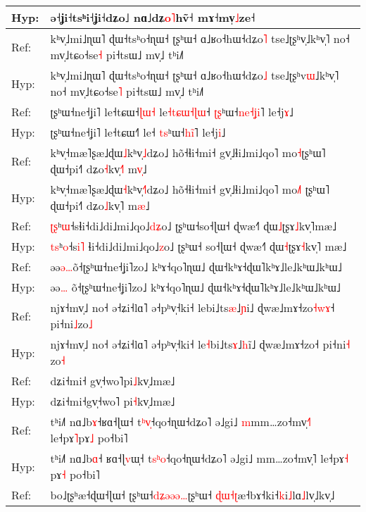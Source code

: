 \documentclass[10pt]{article}
\DeclareRobustCommand{\hl}[1]{{\textcolor{red}{#1}}}
\begin{document}
\begin{longtable}{ll}
Hyp: & ə˧ʝi˧tsʰi˧ʝi˧dʑo˩ nɑ˩dʑ\hl{o}\hl{˥}hṽ˧ mɤ˧mv̩\hl{˩}ze˧ \\ 
\midrule 
Ref: & kʰv̩˩mi˩ɳɯ˥ ɖɯ˧tsʰo˧ɳɯ˧ ʈʂʰɯ˧ ɑ˩ʁo˧hɯ˧dʑo\hl{˥} tse˩ʈʂʰv\hl{̩}˩kʰv̩˥ no˧ mv̩˩tɕo˧se\hl{˧} pi˧tsɯ˩ mv̩˩ tʰi˩˥ \\ 
Hyp: & kʰv̩˩mi˩ɳɯ˥ ɖɯ˧tsʰo˧ɳɯ˧ ʈʂʰɯ˧ ɑ˩ʁo˧hɯ˧dʑo\hl{˩} tse˩ʈʂʰv\hl{ɯ}˩kʰv̩˥ no˧ mv̩˩tɕo˧se\hl{˥} pi˧tsɯ˩ mv̩˩ tʰi˩˥ \\ 
\midrule 
Ref: & ʈʂʰɯ˧ne˧ʝi˥ le˧tɕɯ˧\hl{ɭ}\hl{ɯ}\hl{˧} le\hl{˧}\hl{t}\hl{ɕ}\hl{ɯ}\hl{˧}\hl{ɭ}\hl{ɯ}˧ \hl{ʈ}\hl{ʂ}ʰɯ˧\hl{n}\hl{e}\hl{˧}\hl{ʝ}\hl{i}˥ le˧j\hl{ɤ}˩ \\ 
Hyp: & ʈʂʰɯ˧ne˧ʝi˥ le˧tɕɯ˧\hl{˥} le˧ \hl{t}\hl{s}ʰɯ˧\hl{h}\hl{i}\hl{̃}˥ le˧j\hl{i}˩ \\ 
\midrule 
Ref: & kʰv̩˧mæ˥ʂæ˩ɖɯ\hl{˩}kʰv̩\hl{˩}dʑo˩ hõ˧ɬi˧mi˧ gv̩˩ɬi˩mi˩qo˥ mo\hl{˧}ʈʂʰɯ˥ ɖɯ˧pi˧˥ dʑo\hl{˧}kv̩\hl{˧}˥ m\hl{v}\hl{̩}˩ \\ 
Hyp: & kʰv̩˧mæ˥ʂæ˩ɖɯ\hl{˧}kʰv̩\hl{˧}\hl{˥}dʑo˩ hõ˧ɬi˧mi˧ gv̩˩ɬi˩mi˩qo˥ mo\hl{˩}\hl{˥}\hl{ }ʈʂʰɯ˥ ɖɯ˧pi˧˥ dʑo\hl{˩}kv̩˥ m\hl{æ}˩ \\ 
\midrule 
Ref: & \hl{ʈ}\hl{ʂ}ʰ\hl{ɯ}˧sɬi˧di˩di˩mi˩qo˩\hl{d}\hl{ʑ}o˩ ʈʂʰɯ˧so˧ɭɯ˧ ɖwæ˧˥ ɖɯ\hl{˩}ʈʂɤ\hl{˩}kv̩˥mæ˩ \\ 
Hyp: & \hl{t}\hl{s}ʰ\hl{o}˧s\hl{i}\hl{˥}\hl{ }ɬi˧di˩di˩mi˩qo˩\hl{z}o˩ ʈʂʰɯ˧\hl{ }so˧ɭɯ˧ ɖwæ˧˥ ɖɯ\hl{˧}ʈʂɤ\hl{˧}kv̩˥\hl{ }mæ˩ \\ 
\midrule 
Ref: & əə\hl{ə}\hl{…}õ˧ʈʂʰɯ˧ne˧ʝi˥zo˩ kʰɤ˧qo˥ɳɯ˩ ɖɯ˧kʰɤ˧ɖɯ˥kʰɤ˩le˩kʰɯ˩kʰɯ˩ \\ 
Hyp: & əə\hl{…}\hl{ }õ˧ʈʂʰɯ˧ne˧ʝi˥zo˩ kʰɤ˧qo˥ɳɯ˩ ɖɯ˧kʰɤ˧ɖɯ˥kʰɤ˩le˩kʰɯ˩kʰɯ˩ \\ 
\midrule 
Ref: & njɤ˧mv̩˩ no˧ ə˧ʑi˧lɑ˥ ə˧pʰv̩˧ki˧ lebi˩ts\hl{æ}˩\hl{ɲ}i˩ ɖwæ˩mɤ˧zo\hl{˧}\hl{w}\hl{ɤ}˧ pi˧ni\hl{˩}zo\hl{˩} \\ 
Hyp: & njɤ˧mv̩˩ no˧ ə˧ʑi˧lɑ˥ ə˧pʰv̩˧ki˧ le\hl{˧}bi˩ts\hl{ɤ}˩\hl{h}i\hl{̃}˩ ɖwæ˩mɤ˧zo˧ pi˧ni\hl{˧}\hl{ }zo\hl{˧} \\ 
\midrule 
Ref: & dʑi˧mi˧\hl{ }gv̩˧wo˥pi\hl{˩}kv̩˩mæ˩ \\ 
Hyp: & dʑi˧mi˧gv̩˧wo˥\hl{ }pi\hl{˧}kv̩˩mæ˩ \\ 
\midrule 
Ref: & tʰi˩˥ nɑ˩b\hl{ɤ}˧ʁɑ˧ɭɯ˧ t\hl{ʰ}\hl{v}\hl{̩}˧qo˧ɳɯ˧dʑo˥ ə˩gi˩ \hl{m}mm…zo˧mv̩\hl{˧}˥ le˧pɤ\hl{˥}pɤ\hl{˩} po˧bi˥ \\ 
Hyp: & tʰi˩˥ nɑ˩b\hl{ɑ}˧\hl{ }ʁɑ˧ɭ\hl{v}ɯ\hl{̩}˧ t\hl{s}\hl{ʰ}\hl{o}˧qo˧ɳɯ˧dʑo˥ ə˩gi˩ mm…zo˧mv̩˥ le˧pɤ\hl{˧}\hl{ }pɤ\hl{˧} po˧bi˥ \\ 
\midrule 
Ref: & bo˩ʈʂʰæ˧ɖɯ˧ɭɯ˧ ʈʂʰɯ˧\hl{d}\hl{ʑ}\hl{ə}\hl{ə}\hl{ə}\hl{…}ʈʂʰɯ˧ \hl{ɖ}\hl{ɯ}\hl{˧}\hl{ʈ}æ˧bɤ˧ki˧\hl{k}i\hl{˩}lɑ\hl{˩}lv̩˩kv̩˩ \\ 

\end{longtable}
\end{document}
